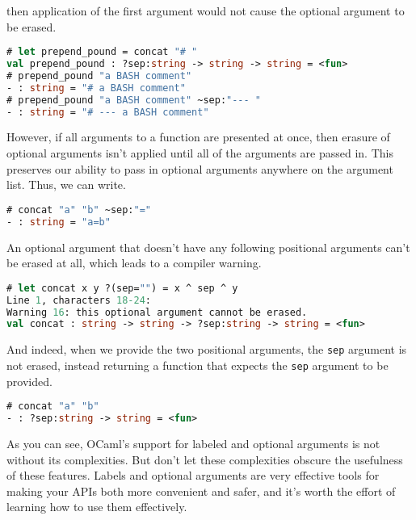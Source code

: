 then application of the first argument would not cause the optional
argument to be erased.

\begin{lstlisting}[language=Caml]
# let prepend_pound = concat "# "
val prepend_pound : ?sep:string -> string -> string = <fun>
# prepend_pound "a BASH comment"
- : string = "# a BASH comment"
# prepend_pound "a BASH comment" ~sep:"--- "
- : string = "# --- a BASH comment"
\end{lstlisting}

However, if all arguments to a function are presented at once, then
erasure of optional arguments isn't applied until all of the arguments
are passed in. This preserves our ability to pass in optional arguments
anywhere on the argument list. Thus, we can write.

\begin{lstlisting}[language=Caml]
# concat "a" "b" ~sep:"="
- : string = "a=b"
\end{lstlisting}

An optional argument that doesn't have any following positional
arguments can't be erased at all, which leads to a compiler warning.

\begin{lstlisting}[language=Caml]
# let concat x y ?(sep="") = x ^ sep ^ y
Line 1, characters 18-24:
Warning 16: this optional argument cannot be erased.
val concat : string -> string -> ?sep:string -> string = <fun>
\end{lstlisting}

And indeed, when we provide the two positional arguments, the
\passthrough{\lstinline!sep!} argument is not erased, instead returning
a function that expects the \passthrough{\lstinline!sep!} argument to be
provided.

\begin{lstlisting}[language=Caml]
# concat "a" "b"
- : ?sep:string -> string = <fun>
\end{lstlisting}

As you can see, OCaml's support for labeled and optional arguments is
not without its complexities. But don't let these complexities obscure
the usefulness of these features. Labels and optional arguments are very
effective tools for making your APIs both more convenient and safer, and
it's worth the effort of learning how to use them effectively.~~
